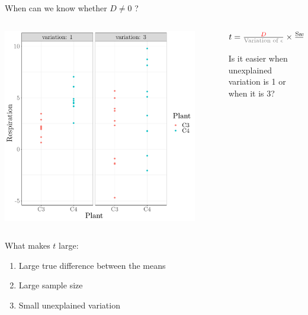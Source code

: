 \documentclass{beamer}
\begin{document}
\begin{frame}{When can we know whether $D \neq 0$ ?}

 \begin{columns}
 \begin{column}{0.5\textwidth}
 \includegraphics[width=0.9\textwidth]{Figures/figure/ttestvar-1}
 \end{column}
 \begin{column}{0.5\textwidth}
  $ t = \frac{\color{red}{D}}{\text{\color{gray}{Variation of }}\color{gray}{\epsilon}} \times \frac{\text{Sample Size}}{\sqrt{2}}$

  \vspace{1cm}
  Is it easier when unexplained variation is 1 or when it is 3?
 \end{column}
 \end{columns}
 
 \pause
 \begin{alertblock}{What makes $t$ large:}
  \begin{enumerate}
   \item Large true difference between the means
   \item Large sample size
   \item Small unexplained variation
  \end{enumerate}
 \end{alertblock}

\end{frame}
\end{document}
